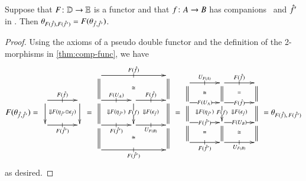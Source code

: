 \documentclass{amsart}
\begin{document}
\begin{lem}\label{thm:theta-func}
  Suppose that $F\colon \mathbb{D}\to\mathbb{E}$ is a functor and that $f\colon A\to
  B$ has companions \fhat\ and $\hat{f}'$ in \lD.  Then
  $\theta_{F(\hat{f}),F(\hat{f}')} = F(\theta_{\hat{f},\hat{f}'})$.
\end{lem}
\begin{proof}
  Using the axioms of a pseudo double functor and the definition of
  the 2-morphisms in \autoref{thm:comp-func}, we have
  \begin{equation}
    F(\theta_{\fhat,\fhat'})
    =\;
    \vcenter{\xymatrix@C=3pc{
        \ar[r]|-@{|}^-{F(\fhat)}
        \ar[d] \ar@{}[dr]|{\Downarrow F(\eta_{\hat{f}'} \odot\epsilon_{\hat{f}})} &  \ar[d]\\
        \ar[r]|-@{|}_-{F(\fhat')} &}}
    \;=\;
    \vcenter{\xymatrix@C=3pc{
        \ar[rr]|-@{|}^-{F(\fhat)}
        \ar@{=}[d] \ar@{}[drr]|\iso &&  \ar@{=}[d]\\
        \ar[r]|-@{|}^-{F(U_{A})} \ar@{=}[d]
        \ar@{}[dr]|{\Downarrow F(\eta_{\hat{f}'})} &
        \ar[r]|-@{|}^-{F(\fhat)} \ar[d]|{F(f)}
        \ar@{}[dr]|{\Downarrow F(\epsilon_{\hat{f}})}
        & \ar@{=}[d]\\
        \ar[r]|-@{|}_-{F(\fhat')} \ar@{}[drr]|\iso\ar@{=}[d] &
        \ar[r]|-@{|}_-{U_{F(B)}} & \ar@{=}[d]\\
        \ar[rr]|-@{|}_-{F(\fhat')} && }}
    \;=\;
    \vcenter{\xymatrix@R=1.5pc@C=3pc{
        \ar[r]|-@{|}^-{U_{F(A)}} \ar@{=}[d] \ar@{}[dr]|\iso &
        \ar[r]|-@{|}^-{F(\fhat)} \ar@{=}[d] \ar@{}[dr]|=
        & \ar@{=}[d]\\
        \ar[r]|-{F(U_{A})} \ar@{=}[d] \ar@{}[dr]|{\Downarrow F(\eta_{\hat{f}'})} &
        \ar[r]|-{F(\fhat)} \ar[d]|{F(f)} \ar@{}[dr]|{\Downarrow F(\epsilon_{\hat{f}})}
        & \ar@{=}[d]\\
        \ar[r]|-{F(\fhat')}  \ar@{=}[d] \ar@{}[dr]|= &
        \ar[r]|-{F(U_{B})} \ar@{}[dr]|\iso  \ar@{=}[d] & \ar@{=}[d]\\
        \ar[r]|-@{|}_-{F(\fhat')} &
        \ar[r]|-@{|}_-{U_{F(B)}} &}}
    \;=
    \theta_{F(\fhat),\,F(\fhat')}
  \end{equation}
  as desired.
\end{proof}
\end{document}
